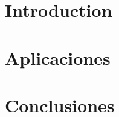 \documentclass[11pt, spanish]{book}
\begin{document}
    \chapter{Introduction}
    
    
    \chapter{Aplicaciones}
    \chapter{Conclusiones}
\end{document}
